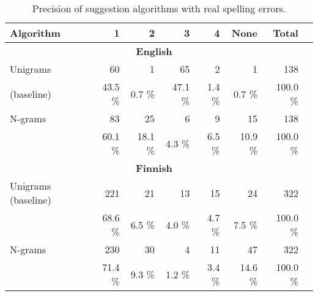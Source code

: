 \documentclass{llncs}
\begin{document}
\begin{table*}[h]
    \caption{Precision of suggestion algorithms with real spelling errors.
    \label{table:real-eval}}
  \begin{center}
    \begin{scriptsize}
      \begin{tabular}{lrrrrrrr}
        \hline
        Algorithm & 1 & 2 & 3 & 4 & None & Total \\
        \hline
        \multicolumn{7}{c}{\textbf{English}} \\
        \hline
        Unigrams 
& 60 & 1 & 65 & 2 & 1 & 138 \\
        (baseline) 
& 43.5 \% & 0.7 \% & 47.1 \% & 1.4 \% & 0.7 \%  & 100.0 \% \\
        \hline
        N-grams 
& 83    & 25    & 6    & 9    & 15    & 138 \\
& 60.1 \% & 18.1 \% & 4.3 \% & 6.5 \% & 10.9 \% & 100.0 \% \\
\hline
        \multicolumn{7}{c}{\textbf{Finnish}} \\
        \hline
        Unigrams  
        (baseline) 
& 221    & 21    & 13    & 15    & 24    & 322 \\
& 68.6 \% & 6.5 \% & 4.0 \% & 4.7 \% & 7.5 \% & 100.0 \% \\

        \hline
        N-grams
& 230    & 30    & 4    & 11    & 47    & 322 \\
& 71.4 \% & 9.3 \% & 1.2 \% & 3.4 \% & 14.6 \% & 100.0 \% \\
        \hline
      \end{tabular}
    \end{scriptsize}
  \end{center}
\end{table*}
\end{document}
